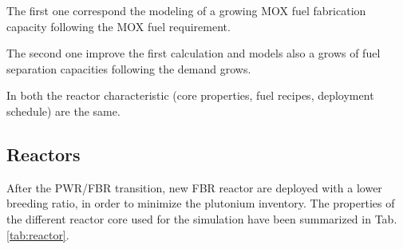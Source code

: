 \documentclass[12pt]{article}
\begin{document}
The first one correspond the modeling
of a growing MOX fuel fabrication capacity
following the MOX fuel requirement.


The second one improve the first calculation and
models also a grows of fuel separation capacities
following the demand grows.

In both the reactor characteristic (core
properties, fuel recipes, deployment schedule) are
the same.
\subsection{Reactors}
After the PWR/FBR transition, new FBR reactor are
deployed with a lower breeding ratio, in order to
minimize the plutonium inventory. The properties
of the different reactor core used for the
simulation have been summarized in
Tab.\ref{tab:reactor}.\\
\end{document}
